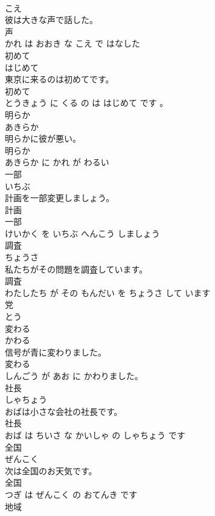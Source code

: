\documentclass[8pt]{extreport}
\begin{document}
\begin{CJK}{UTF8}{min}
\\	こえ			
\\	彼は大きな声で話した。	
\\	声 
\\	かれ は おおき な こえ で はなした			
\\	初めて	
\\	はじめて			
\\	東京に来るのは初めてです。	
\\	初めて 
\\	とうきょう に くる の は はじめて です 。			
\\	明らか	
\\	あきらか			
\\	明らかに彼が悪い。	
\\	明らか 
\\	あきらか に かれ が わるい			
\\	一部	
\\	いちぶ			
\\	計画を一部変更しましょう。	
\\	計画 
\\	一部 
\\	けいかく を いちぶ へんこう しましょう			
\\	調査	
\\	ちょうさ			
\\	私たちがその問題を調査しています。	
\\	調査 
\\	わたしたち が その もんだい を ちょうさ して います			
\\	党	
\\	とう			
\\	変わる	
\\	かわる			
\\	信号が青に変わりました。	
\\	変わる 
\\	しんごう が あお に かわりました。			
\\	社長	
\\	しゃちょう			
\\	おばは小さな会社の社長です。	
\\	社長 
\\	おば は ちいさ な かいしゃ の しゃちょう です			
\\	全国	
\\	ぜんこく			
\\	次は全国のお天気です。	
\\	全国 
\\	つぎ は ぜんこく の おてんき です			
\\	地域	

\end{CJK}
\end{document}
